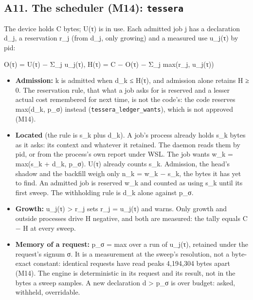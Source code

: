 \subsection{\texorpdfstring{A11. The scheduler (M14): \texttt{tessera}}{A11. The scheduler (M14): tessera}}

The device holds C bytes; U(τ) is in use. Each admitted job j has a declaration d\_\allowbreak{}j, a reservation r\_\allowbreak{}j (from d\_\allowbreak{}j, only growing) and a measured use u\_\allowbreak{}j(τ) by pid:

O(τ) = U(τ) − Σ\_\allowbreak{}j u\_\allowbreak{}j(τ),  H(τ) = C − O(τ) − Σ\_\allowbreak{}j max(r\_\allowbreak{}j, u\_\allowbreak{}j(τ))

\begin{itemize}
\item \textbf{Admission:} k is admitted when d\_\allowbreak{}k ≤ H(τ), and admission alone retains H ≥ 0. The reservation rule, that what a job asks for is reserved and a lesser actual cost remembered for next time, is not the code's: the code reserves max(d\_\allowbreak{}k, p\_\allowbreak{}σ) instead (\texttt{tessera\_\allowbreak{}ledger\_\allowbreak{}wants}), which is not approved (M14).
\item \textbf{Located} (the rule is s\_\allowbreak{}k plus d\_\allowbreak{}k). A job's process already holds s\_\allowbreak{}k bytes as it asks: its context and whatever it retained. The daemon reads them by pid, or from the process's own report under WSL. The job wants w\_\allowbreak{}k = max(s\_\allowbreak{}k + d\_\allowbreak{}k, p\_\allowbreak{}σ). U(τ) already counts s\_\allowbreak{}k. Admission, the head's shadow and the backfill weigh only n\_\allowbreak{}k = w\_\allowbreak{}k − s\_\allowbreak{}k, the bytes it has yet to find. An admitted job is reserved w\_\allowbreak{}k and counted as using s\_\allowbreak{}k until its first sweep. The withholding rule is d\_\allowbreak{}k alone against p\_\allowbreak{}σ.
\item \textbf{Growth:} u\_\allowbreak{}j(τ) > r\_\allowbreak{}j sets r\_\allowbreak{}j = u\_\allowbreak{}j(τ) and warns. Only growth and outside processes drive H negative, and both are measured: the tally equals C − H at every sweep.
\item \textbf{Memory of a request:} p\_\allowbreak{}σ = max over a run of u\_\allowbreak{}j(τ), retained under the request's signum σ. It is a measurement at the sweep's resolution, not a byte-exact constant: identical requests have read peaks 4,194,304 bytes apart (M14). The engine is deterministic in its request and its result, not in the bytes a sweep samples. A new declaration d > p\_\allowbreak{}σ is over budget: asked, withheld, overridable.

\end{itemize}
